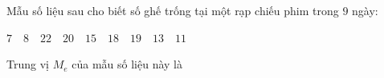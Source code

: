\begin{ex}
Mẫu số liệu sau cho biết số ghế trống tại một rạp chiếu phim trong $9$ ngày:
\begin{center}
$7 \quad 8 \quad 22 \quad 20 \quad 15 \quad 18 \quad 19 \quad 13 \quad 11$
\end{center}
Trung vị $M_e$ của mẫu số liệu này là
\end{ex}
